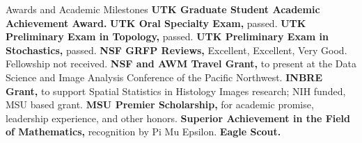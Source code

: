 \begin{rubric}{Awards and Academic Milestones}
\entry*[2026] \textbf{UTK Graduate Student Academic Achievement Award.}
\entry*[2025] \textbf{UTK Oral Specialty Exam,} passed.
\entry*[2025] \textbf{UTK Preliminary Exam in Topology,} passed.
\entry*[2025] \textbf{UTK Preliminary Exam in Stochastics,} passed.
\entry*[2020] \textbf{NSF GRFP Reviews,} Excellent, Excellent, Very Good. Fellowship not received.
\entry*[2020] \textbf{NSF and AWM Travel Grant,} to present at the Data Science and Image Analysis Conference of the Pacific Northwest.
\entry*[2019--2020] \textbf{INBRE Grant,} to support Spatial Statistics in Histology Images research; NIH funded, MSU based grant.
\entry*[2016--2020] \textbf{MSU Premier Scholarship,} for academic promise, leadership experience, and other honors.
\entry*[2019] \textbf{Superior Achievement in the Field of Mathematics,} recognition by Pi Mu Epsilon.
\entry*[2016] \textbf{Eagle Scout.}
\end{rubric}
